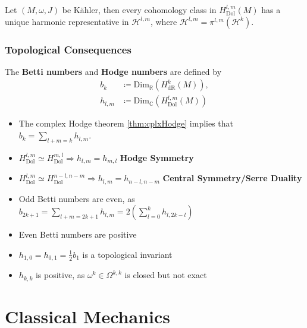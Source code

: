 \documentclass[11pt, final]{article}
\begin{document}
\begin{theorem}
	Let $(M,\omega,J)$ be K\"ahler, then every cohomology class in $H^{l,m}_\mathrm{Dol}(M)$ has a unique harmonic representative in $\mathcal{H}^{l,m}$, where $\mathcal{H}^{l,m} = \pi^{l,m}\left( \mathcal{H}^k \right)$.
\end{theorem}

\subsubsection{Topological Consequences}

\begin{definition}
	The \textbf{Betti numbers} and \textbf{Hodge numbers} are defined by
		\begin{align}
			b_k &\coloneqq \mathrm{Dim}_\mathbb{R}\left( H^k_{\mathrm{dR}} (M) \right), \\
			h_{l,m} &\coloneqq \mathrm{Dim}_\mathbb{C} \left( H^{l,m}_\mathrm{Dol}(M) \right)
		\end{align}
\end{definition}
\begin{remark}\hfill
	\begin{itemize}
		\item The complex Hodge theorem \ref{thm:cplxHodge} implies that $b_k = \sum_{l+m=k} h_{l,m}$.
		\item $H^{l,m}_{\mathrm{Dol}} \simeq H^{m,l}_{\mathrm{Dol}} \Rightarrow h_{l,m} = h_{m,l}$ \hfill {\textbf{Hodge Symmetry}}
		\item $H^{l,m}_{\mathrm{Dol}} \simeq H^{n-l,n-m}_{\mathrm{Dol}} \Rightarrow h_{l,m} = h_{n-l,n-m}$ \hfill \textbf{Central Symmetry/Serre Duality}
		\item Odd Betti numbers are even, as $b_{2k+1} = \sum_{l+m = 2k+1}h_{l,m} = 2\left(\sum_{l=0}^k h_{l,2k-l} \right)$
		\item Even Betti numbers are positive
		\item $h_{1,0} = h_{0,1} = \tfrac{1}{2}b_1$ is a topological invariant
		\item $h_{k,k}$ is positive, as $\omega^k \in \Omega^{k,k}$ is closed but not exact
	\end{itemize}
\end{remark}

\section{Classical Mechanics}
\end{document}
